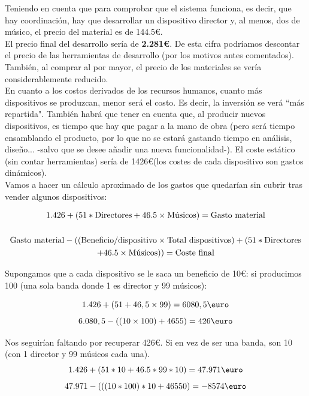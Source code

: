 Teniendo en cuenta que para comprobar que el sistema funciona, es decir, que hay
coordinación, hay que desarrollar un dispositivo director y,  al menos, dos de músico,
el precio del material es de 144.5\euro.\\

El precio final del desarrollo sería de \textbf{2.281\euro}. De esta cifra podríamos
descontar el precio de las herramientas de desarrollo (por los motivos antes comentados).
También, al comprar al por mayor, el precio de los materiales se vería considerablemente
reducido.\\

En cuanto a los costos derivados de los recursos humanos, cuanto más dispositivos se produzcan,
menor será el costo. Es decir, la inversión se verá ``más repartida". También habrá que tener en
cuenta que, al producir nuevos dispositivos, es tiempo que hay que pagar a la mano de obra
(pero será tiempo ensamblando el producto, por lo que no se estará gastando tiempo en análisis,
diseño... -salvo que se desee añadir una nueva funcionalidad-). El coste estático (sin contar herramientas)
sería de 1426\euro (los costes de cada dispositivo son gastos dinámicos).\\

Vamos a hacer un cálculo aproximado de los gastos que quedarían sin cubrir tras vender algunos dispositivos:

\begin{gather*}
  1.426 + (51 * \textup{Directores} +46.5 \times \textup{Músicos}) = \textup{Gasto material} \\ \\
  \textup{Gasto material} - ((\textup{Beneficio/dispositivo} \times \textup{Total dispositivos})+(51 * \textup{Directores}\\
  + 46.5 \times \textup{Músicos})) = \textup{Coste final}
\end{gather*}

Supongamos que a cada dispositivo se le saca un beneficio de 10\euro: si producimos 100
(una sola banda donde 1 es director y 99 músicos):

\[
  1.426 + (51+46,5 \times 99) = 6080,5  \textup{\euro}
\]
\[
  6.080,5 - ((10 \times 100)+4655) = 426  \textup{\euro}
\]

Nos seguirían faltando por recuperar 426\euro. Si en vez de ser una banda, son 10
(con 1 director y 99 músicos cada una).\\


\[
  1.426 + (51*10+46.5*99*10) = 47.971  \textup{\euro}
\]
\[
  47.971 - (((10*100)*10+46550) = -8574  \textup{\euro}
\]


